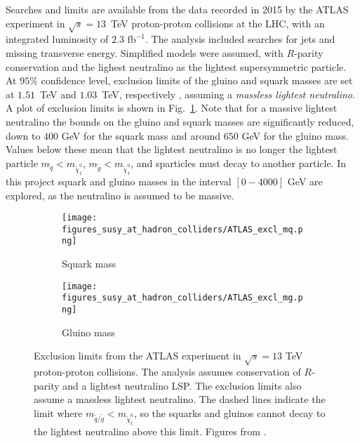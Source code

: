 \documentclass[twoside,english]{uiofysmaster}
\begin{document}
{Searches and limits are available from the data recorded in 2015 by the ATLAS experiment in $\sqrt{s}=13$~TeV proton-proton collisions at the LHC, with an integrated luminosity of $2.3 \text{ fb}^{-1}$. The analysis included searches for jets and missing transverse energy. Simplified models were assumed, with $R$-parity conservation and the lighest neutralino as the lightest supersymmetric particle. At $95 \%$ confidence level, exclusion limits of the gluino and squark masses are set at $1.51$~TeV and $1.03$~TeV, respectively \cite{aaboud2016search}, assuming a \textit{massless lightest neutralino}. A plot of exclusion limits is shown in Fig.\ \ref{Fig:: susy hadron : ATLAS exclusion limits}. Note that for a massive lightest neutralino the bounds on the gluino and squark masses are significantly reduced, down to $400$ GeV for the squark mass and around $650$ GeV for the gluino mass. Values below these mean that the lightest neutralino is no longer the lightest particle $m_{\widetilde{q}} < m_{\widetilde{\chi}^0_1}$, $m_{\widetilde{g}} < m_{\widetilde{\chi}^0_1}$, and sparticles must decay to another particle. In this project squark and gluino masses in the interval $[0-4000]$ GeV are explored, as the neutralino is assumed to be massive.

\begin{figure}[H]
    \centering
    \begin{subfigure}[b]{0.8\textwidth}
        \texttt{[image: figures\_susy\_at\_hadron\_colliders/ATLAS\_excl\_mq.png]}
        \caption{Squark mass}
    \end{subfigure}
    \begin{subfigure}[b]{0.8\textwidth}
        \texttt{[image: figures\_susy\_at\_hadron\_colliders/ATLAS\_excl\_mg.png]}
        \caption{Gluino mass}
    \end{subfigure}
    \caption{Exclusion limits from the ATLAS experiment in $\sqrt{s} = 13$ TeV proton-proton collisions. The analysis assumes conservation of $R$-parity and a lightest neutralino LSP. The exclusion limits also assume a massless lightest neutralino. The dashed lines indicate the limit where $m_{\widetilde{q}/\widetilde{g}} < m_{\widetilde{\chi}^0_1}$, so the squarks and gluinos cannot decay to the lightest neutralino above this limit. Figures from \cite{aaboud2016search}.}\label{Fig:: susy hadron : ATLAS exclusion limits}
\end{figure}


}
\end{document}
